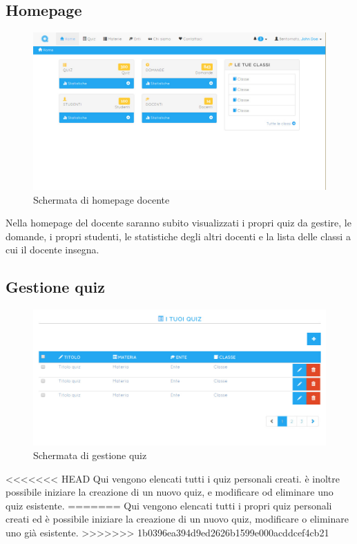 \documentclass[a4paper, titlepage]{article}
\begin{document}
	 \subsection{Homepage}
	 \begin{figure}[!h]
	 	\centering
	 	\includegraphics[scale=0.33]{Img/screen_HomepageDocente.png}
	 	\caption{Schermata di homepage docente}
	 \end{figure}
	 Nella homepage del docente saranno subito visualizzati i propri quiz da gestire, le domande, i propri studenti, le statistiche degli altri docenti e la lista delle classi a cui il docente insegna.
	 
	 
	 \subsection{Gestione quiz}
	 \begin{figure}[!h]
	 	\centering
	 	\includegraphics[scale=0.33]{Img/screen_GestioneQuiz.png}
	 	\caption{Schermata di gestione quiz}
	 \end{figure}
<<<<<<< HEAD
	 Qui vengono elencati tutti i quiz personali creati. è inoltre possibile iniziare la creazione di un nuovo quiz, e modificare od eliminare uno quiz esistente.
=======
	 Qui vengono elencati tutti i propri quiz personali creati ed è possibile iniziare la creazione di un nuovo quiz, modificare o eliminare uno già esistente.
>>>>>>> 1b0396ea394d9ed2626b1599e000acddcef4cb21
	 
\end{document}
